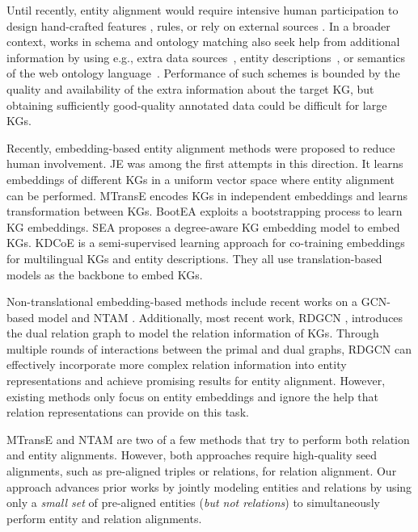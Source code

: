 \documentclass[11pt,a4paper]{article}
\begin{document}
Until recently, entity alignment would require intensive human participation \cite{VrandecicKroetzsch14cacm} to design hand-crafted
features \cite{mahdisoltani2013yago3}, rules, or rely on external sources \cite{Wang2017}. In a broader context, works in schema and
ontology matching also seek help from additional information by using e.g., extra data sources~\cite{Nguyen:2011:MSM:2078324.2078329}, entity
descriptions~\cite{lacoste2013sigma,yang2015entity}, or semantics of the web ontology language~\cite{hu2011self}. Performance of such
schemes is bounded by the quality and availability of the extra information about the target KG, but obtaining sufficiently good-quality
annotated data could be difficult for large KGs.


Recently, embedding-based entity alignment methods were proposed to reduce human involvement. JE \cite{hao2016joint} was among the first attempts in this
direction. It learns embeddings of different KGs in a uniform vector space where entity alignment can be performed. MTransE
\cite{chen2016multilingual} encodes KGs in independent embeddings and learns transformation between KGs. BootEA \cite{ijcai2018-611}
exploits a bootstrapping process to learn KG embeddings. SEA \cite{Pei:2019:SEA:3308558.3313646} proposes a degree-aware KG embedding model to embed KGs. KDCoE \cite{Chen2018Co} is a semi-supervised learning approach for co-training embeddings for multilingual KGs and entity descriptions. They all use translation-based models as the backbone to embed KGs. 

Non-translational embedding-based methods include recent works on a GCN-based model \cite{D18-1032}
and NTAM \cite{ijcai2018-581}. Additionally, most recent work, RDGCN \cite{ijcai2019-733}, introduces the dual relation graph to model the relation information of KGs. Through multiple rounds of interactions between the primal and dual graphs, RDGCN can effectively incorporate more complex relation information into entity representations and achieve promising results for entity alignment. However, existing methods only focus on entity embeddings and ignore the help that relation representations can provide on this task.

MTransE and NTAM are two of a few methods that try to perform both relation and entity alignments. However,
both approaches require high-quality seed alignments, such as pre-aligned triples or relations, for relation alignment.
Our approach advances prior works by jointly modeling entities and relations by using only a \emph{small set} of pre-aligned entities (\emph{but not relations}) to simultaneously perform entity and relation alignments.
\end{document}

